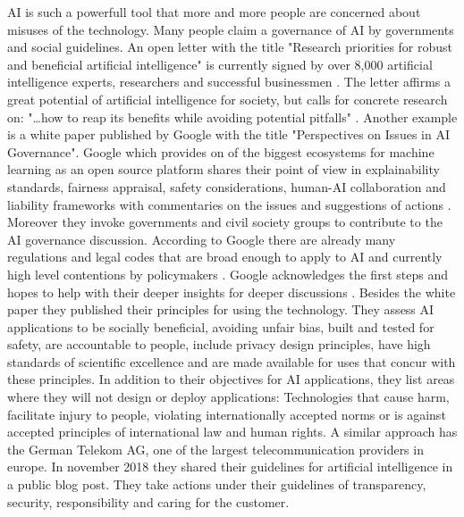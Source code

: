 AI is such a powerfull tool that more and more people are concerned about misuses of the technology.
Many people claim a governance of AI by governments and social guidelines.
An open letter with the title "Research priorities for robust and beneficial artificial intelligence" is currently signed by over 8,000 artificial intelligence experts, researchers and successful businessmen \cite{futureoflife-ai-open-letter, futureoflife-research-priorities}.
The letter affirms a great potential of artificial intelligence for society, but calls for concrete research on: "…how to reap its benefits while avoiding potential pitfalls" \cite{futureoflife-ai-open-letter}.
Another example is a white paper published by Google with the title "Perspectives on Issues in AI Governance".
Google which provides on of the biggest ecosystems for machine learning as an open source platform shares their point of view in explainability standards, fairness appraisal, safety considerations, human-AI collaboration and liability frameworks with commentaries on the issues and suggestions of actions \cite{google-ai-governance}.
Moreover they invoke governments and civil society groups to contribute to the AI governance discussion.
According to Google there are already many regulations and legal codes that are broad enough to apply to AI and currently high level contentions by policymakers \cite[page 3,]{google-ai-governance}.
Google acknowledges the first steps and hopes to help with their deeper insights for deeper discussions \cite[page 4]{google-ai-governance}.
\hfill \break
Besides the white paper they published their principles for using the technology.
They assess AI applications to be socially beneficial, avoiding unfair bias, built and tested for safety, are accountable to people, include privacy design principles, have high standards of scientific excellence and are made available for uses that concur with these principles.
In addition to their objectives for AI applications, they list areas where they will not design or deploy applications:
Technologies that cause harm, facilitate injury to people, violating internationally accepted norms or is against accepted principles of international law and human rights.
\cite{google-ai-principles}
\hfill \break
A similar approach has the German Telekom AG, one of the largest telecommunication providers in europe.
In november 2018 they shared their guidelines for artificial intelligence in a public blog post.
They take actions under their guidelines of transparency, security, responsibility and caring for the customer.
\cite{telekom-ai-guidelines}

